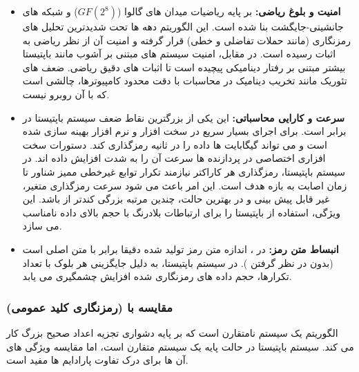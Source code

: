 \documentclass[12pt]{report}
\begin{document}
\begin{itemize}[leftmargin=*]
    \item \textbf{امنیت و بلوغ ریاضی:}  بر پایه ریاضیات میدان های گالوا ($GF(2^8)$) و 
    شبکه های جانشینی-جایگشت بنا شده است. این الگوریتم دهه ها تحت شدیدترین 
    تحلیل های رمزنگاری (مانند حملات تفاضلی و خطی) قرار گرفته و امنیت آن از نظر ریاضی به اثبات 
    رسیده است. در مقابل، امنیت سیستم های مبتنی بر آشوب مانند باپتیستا بیشتر مبتنی بر رفتار 
    دینامیکی پیچیده است تا اثبات های دقیق ریاضی. ضعف های تئوریک مانند تخریب دینامیک در محاسبات 
    با دقت محدود کامپیوترها، چالشی است که  با آن روبرو نیست.
    
    \item \textbf{سرعت و کارایی محاسباتی:} این یکی از بزرگترین 
    نقاط ضعف سیستم باپتیستا در برابر  است.  برای اجرای بسیار سریع در سخت افزار 
    و نرم افزار بهینه سازی شده است و می تواند گیگابایت ها داده را در ثانیه رمزگذاری کند. 
    دستورات سخت افزاری اختصاصی در پردازنده ها سرعت آن را به شدت افزایش 
    داده اند. در سیستم باپتیستا، رمزگذاری هر کاراکتر نیازمند تکرار توابع غیرخطی ممیز شناور
     تا زمان اصابت به بازه هدف است. این امر باعث می شود سرعت 
    رمزگذاری متغیر، غیر قابل پیش بینی و در بهترین حالت، چندین مرتبه بزرگی
     کندتر از  باشد. این ویژگی، استفاده از باپتیستا 
    را برای ارتباطات بلادرنگ با حجم بالای داده نامناسب می سازد.
    
    \item \textbf{انبساط متن رمز:} در ، اندازه متن رمز تولید شده دقیقا برابر با متن اصلی 
    است (بدون در نظر گرفتن ). در سیستم باپتیستا، به دلیل جایگزینی هر بلوک با تعداد 
    تکرارها، حجم داده های رمزنگاری شده افزایش چشمگیری می یابد.
\end{itemize}

\subsubsection{مقایسه با  (رمزنگاری کلید عمومی)}
الگوریتم  یک سیستم نامتقارن است که بر پایه دشواری تجزیه اعداد صحیح بزرگ
 کار می کند. سیستم باپتیستا در حالت پایه یک سیستم متقارن 
است، اما مقایسه ویژگی های آن ها برای درک تفاوت پارادایم ها مفید است.
\end{document}
